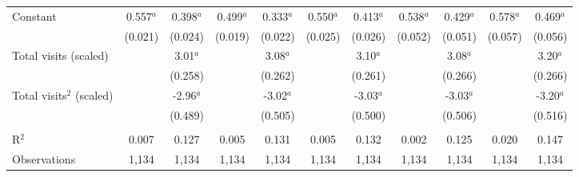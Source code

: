 \begin{tabular}{lcccccccccc}
   Constant                  & 0.557$^{a}$  & 0.398$^{a}$  & 0.499$^{a}$ & 0.333$^{a}$ & 0.550$^{a}$  & 0.413$^{a}$  & 0.538$^{a}$ & 0.429$^{a}$ & 0.578$^{a}$  & 0.469$^{a}$\\   
                             & (0.021)      & (0.024)      & (0.019)     & (0.022)     & (0.025)      & (0.026)      & (0.052)     & (0.051)     & (0.057)      & (0.056)\\   
   Total visits (scaled)     &              & 3.01$^{a}$   &             & 3.08$^{a}$  &              & 3.10$^{a}$   &             & 3.08$^{a}$  &              & 3.20$^{a}$\\   
                             &              & (0.258)      &             & (0.262)     &              & (0.261)      &             & (0.266)     &              & (0.266)\\   
   Total visits$^2$ (scaled) &              & -2.96$^{a}$  &             & -3.02$^{a}$ &              & -3.03$^{a}$  &             & -3.03$^{a}$ &              & -3.20$^{a}$\\   
                             &              & (0.489)      &             & (0.505)     &              & (0.500)      &             & (0.506)     &              & (0.516)\\   
    \\
   R$^2$                     & 0.007        & 0.127        & 0.005       & 0.131       & 0.005        & 0.132        & 0.002       & 0.125       & 0.020        & 0.147\\  
   Observations              & 1,134        & 1,134        & 1,134       & 1,134       & 1,134        & 1,134        & 1,134       & 1,134       & 1,134        & 1,134\\  
   \bottomrule
\end{tabular}
\par\endgroup


